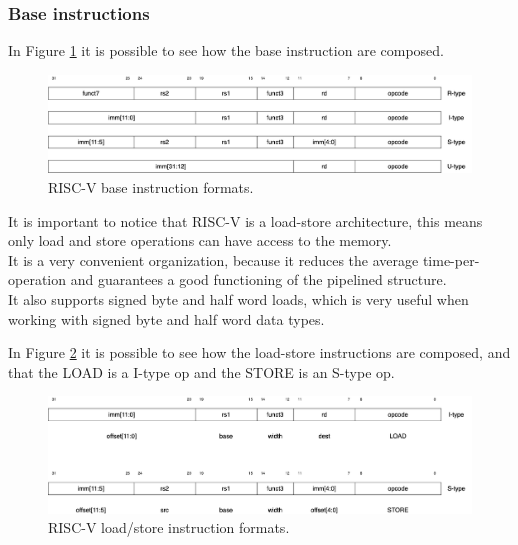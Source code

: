 \subsubsection{Base instructions}
In Figure \ref{riscv-base-instruction-formats} it is possible to see how the base instruction are composed.

\begin{figure}[H]
    \centering
    \includegraphics[scale = 0.27]{Chapter_1/img/riscv-base-instruction-formats.png}
    \caption{RISC-V base instruction formats. \cite{RISC-V-Instruction-Set-Manual}}
    \label{riscv-base-instruction-formats}
\end{figure}

It is important to notice that RISC-V is a load-store architecture, this means only load and store operations can have access to the memory.\\
It is a very convenient organization, because it reduces the average time-per-operation and guarantees a good functioning of the pipelined structure.\\

It also supports signed byte and half word loads, which is very useful when  working with signed byte and half word data types.

In Figure \ref{riscv-load-store} it is possible to see how the load-store instructions are composed, and that the LOAD is a I-type op and the STORE is an S-type op.

\begin{figure}[H]
    \centering
    \includegraphics[scale = 0.27]{Chapter_1/img/riscv-load-store.png}
    \caption{RISC-V load/store instruction formats. \cite{RISC-V-Instruction-Set-Manual}}
    \label{riscv-load-store}
\end{figure}


